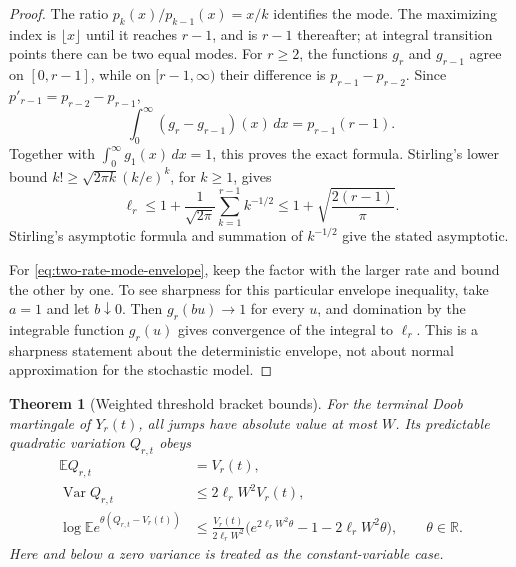 \documentclass[11pt]{article}
\numberwithin{equation}{section}
\newtheorem{theorem}{Theorem}[section]
\theoremstyle{remark}
\begin{document}
\begin{proof}
The ratio $p_k(x)/p_{k-1}(x)=x/k$ identifies the mode. The maximizing
index is $\lfloor x\rfloor$ until it reaches $r-1$, and is $r-1$
thereafter; at integral transition points there can be two equal modes.
For $r\ge2$, the functions $g_r$ and $g_{r-1}$ agree on $[0,r-1]$, while
on $[r-1,\infty)$ their difference is $p_{r-1}-p_{r-2}$.
Since $p'_{r-1}=p_{r-2}-p_{r-1}$,
\[
 \int_0^\infty(g_r-g_{r-1})(x)\,dx
 =p_{r-1}(r-1).
\]
Together with $\int_0^\infty g_1(x)\,dx=1$, this proves the exact formula.
Stirling's lower bound $k!\ge\sqrt{2\pi k}(k/e)^k$, for $k\ge1$, gives
\[
 \ell_r\le1+\frac1{\sqrt{2\pi}}\sum_{k=1}^{r-1}k^{-1/2}
 \le1+\sqrt{\frac{2(r-1)}\pi}.
\]
Stirling's asymptotic formula and summation of $k^{-1/2}$ give the stated
asymptotic.

For \eqref{eq:two-rate-mode-envelope}, keep the factor with the larger
rate and bound the other by one. To see sharpness for this particular
envelope inequality, take $a=1$ and let $b\downarrow0$.
Then $g_r(bu)\to1$ for every $u$, and domination by the integrable
function $g_r(u)$ gives convergence of the integral to $\ell_r$.
This is a sharpness statement about the deterministic envelope, not about
normal approximation for the stochastic model.
\end{proof}

\begin{theorem}[Weighted threshold bracket bounds]
\label{thm:sharper-threshold-bracket}
For the terminal Doob martingale of $Y_r(t)$, all jumps have absolute
value at most $W$. Its predictable quadratic variation $Q_{r,t}$ obeys
\begin{align}
 \mathbb EQ_{r,t}&=V_r(t),\\
 \operatorname{Var}Q_{r,t}&\le2\ell_rW^2V_r(t),
       \label{eq:sharper-threshold-bracket-variance}\\
 \log\mathbb E e^{\theta(Q_{r,t}-V_r(t))}
 &\le\frac{V_r(t)}{2\ell_rW^2}
       \bigl(e^{2\ell_rW^2\theta}-1-2\ell_rW^2\theta\bigr),
       \qquad \theta\in\mathbb R.
       \label{eq:sharper-threshold-bracket-mgf}
\end{align}
Here and below a zero variance is treated as the constant-variable case.
\end{theorem}
\end{document}
